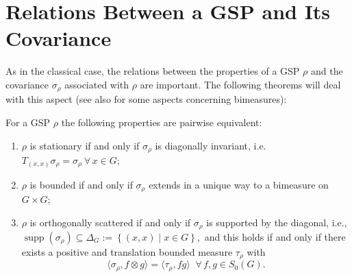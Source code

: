\documentclass[graybox]{svmult}
\begin{document}


\section{Relations Between a GSP and Its Covariance}
\label{ch18:sec2}

As in the classical case, the relations between the properties
of a GSP $\rho $ and the covariance ${\sigma_{ \rho}}$ associated with
$\rho $ are important.  The following theorems will deal with this
aspect (see also \cite{ni75-1} for some aspects concerning
bimeasures):

\begin{theorem}\label{ch18:the1}
For a GSP $\rho $ the
following properties are pairwise equivalent:
\begin{enumerate}
\item[(a)] $\rho$  is stationary if and only if ${\sigma_{ \rho}}$ is
diagonally invariant,
i.e.  $ T_{(x,x)} {\sigma_{ \rho}} =
{\sigma_{ \rho}} \ \forall \, x \in G; $

\item[(b)] $\rho $ is bounded if and only if ${\sigma_{ \rho}}$
extends in a unique way to a bimeasure on $G\times G$;

\item[(c)] $\rho $ is orthogonally scattered %
if and only if
${\sigma_{ \rho}}$ is supported by the diagonal, i.e.,
 $ \operatorname{supp}({\sigma_{ \rho}}) \subseteq \varDelta_{G}
 := \left\{ (x,x) \mid x\in {}G \right\},$
and this holds if and only if
there exists a positive and translation
bounded measure $\tau_{\rho}$ with
\[
\langle{\sigma_{ \rho}},f\otimes g\rangle = \langle\tau_{\rho},fg\rangle
\ \, \, \forall \, f,g \in {S_{0}(G)}.
\]
\end{enumerate}
\end{theorem}
\end{document}
